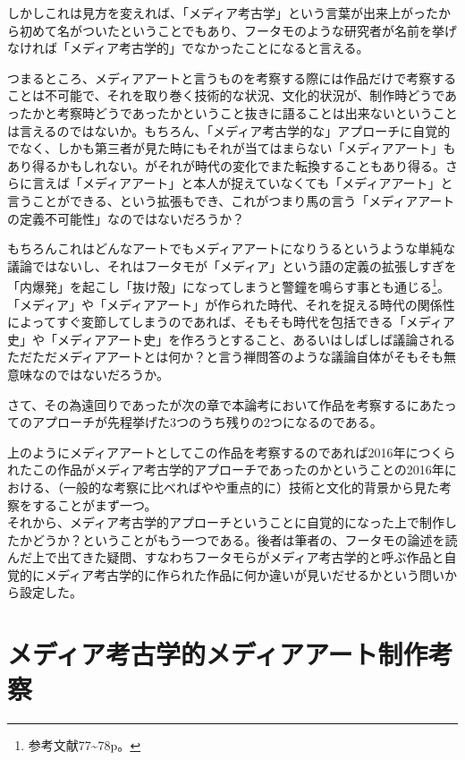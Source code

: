 \documentclass[a4paper,report]{jsbook}
\begin{document}
しかしこれは見方を変えれば、「メディア考古学」という言葉が出来上がったから初めて名がついたということでもあり、フータモのような研究者が名前を挙げなければ「メディア考古学的」でなかったことになると言える。

つまるところ、メディアアートと言うものを考察する際には作品だけで考察することは不可能で、それを取り巻く技術的な状況、文化的状況が、制作時どうであったかと考察時どうであったかということ抜きに語ることは出来ないということは言えるのではないか。もちろん、「メディア考古学的な」アプローチに自覚的でなく、しかも第三者が見た時にもそれが当てはまらない「メディアアート」もあり得るかもしれない。がそれが時代の変化でまた転換することもあり得る。さらに言えば「メディアアート」と本人が捉えていなくても「メディアアート」と言うことができる、という拡張もでき、これがつまり馬の言う「メディアアートの定義不可能性」なのではないだろうか？

もちろんこれはどんなアートでもメディアアートになりうるというような単純な議論ではないし、それはフータモが「メディア」という語の定義の拡張しすぎを「内爆発」を起こし「抜け殻」になってしまうと警鐘を鳴らす事とも通じる\footnote{参考文献\autocite{huhtamo:mediaarcheology}77\textasciitilde{}78p。}。「メディア」や「メディアアート」が作られた時代、それを捉える時代の関係性によってすぐ変節してしまうのであれば、そもそも時代を包括できる「メディア史」や「メディアアート史」を作ろうとすること、あるいはしばしば議論されるただただメディアアートとは何か？と言う禅問答のような議論自体がそもそも無意味なのではないだろうか。

さて、その為遠回りであったが次の章で本論考において作品を考察するにあたってのアプローチが先程挙げた3つのうち残りの2つになるのである。

上のようにメディアアートとしてこの作品を考察するのであれば2016年につくられたこの作品がメディア考古学的アプローチであったのかということの2016年における、（一般的な考察に比べればやや重点的に）技術と文化的背景から見た考察をすることがまず一つ。\\
それから、メディア考古学的アプローチということに自覚的になった上で制作したかどうか？ということがもう一つである。後者は筆者の、フータモの論述を読んだ上で出てきた疑問、すなわちフータモらがメディア考古学的と呼ぶ作品と自覚的にメディア考古学的に作られた作品に何か違いが見いだせるかという問いから設定した。

\chapter{メディア考古学的メディアアート制作考察}\label{ux30e1ux30c7ux30a3ux30a2ux8003ux53e4ux5b66ux7684ux30e1ux30c7ux30a3ux30a2ux30a2ux30fcux30c8ux5236ux4f5cux8003ux5bdf}
\end{document}
